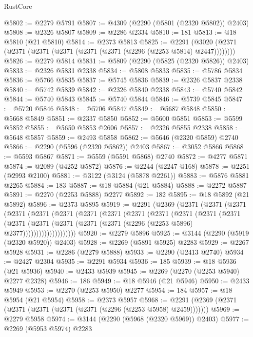 \begin{lexlean}{RustCore}
\begin{coremodule}
@5802 := @2279 @5791
@5807 := @4309 (@2290 (@5801 (@2320 @5802)) @2403)
@5808 := @2326 @5807
@5809 := @2286 @2334
@5810 := 181
@5813 := @18 @5810 (@21 @5810)
@5814 := @2373 @5813
@5825 := @2291 (@3020 (@2371 (@2371 (@2371 (@2371 (@2371 (@2371 (@2296 (@2253 @5814) @2447))))))))
@5826 := @2279 @5814
@5831 := @5809 (@2290 (@5825 (@2320 @5826)) @2403)
@5833 := @2326 @5831 @2338
@5834 := @5808 @5833
@5835 := @5786 @5834
@5836 := @5766 @5835
@5837 := @5745 @5836
@5839 := @2326 @5837 @2338
@5840 := @5742 @5839
@5842 := @2326 @5840 @2338
@5843 := @5740 @5842
@5844 := @5740 @5843
@5845 := @5740 @5844
@5846 := @5739 @5845
@5847 := @5720 @5846
@5848 := @5706 @5847
@5849 := @5687 @5848
@5850 := @5668 @5849
@5851 := @2337 @5850
@5852 := @5600 @5851
@5853 := @5599 @5852
@5855 := @5650 @5853 @2606
@5857 := @2326 @5855 @2338
@5858 := @5648 @5857
@5859 := @2493 @5858
@5862 := @5646 (@2320 @5859) @2740
@5866 := @2290 (@5596 (@2320 @5862)) @2403
@5867 := @3052 @5866
@5868 := @5593 @5867
@5871 := @5559 (@5591 @5868) @2740
@5872 := @4277 @5871
@5874 := @2089 (@4252 @5872)
@5876 := @2244 (@2247 @168)
@5878 := @2251 (@2993 @2100)
@5881 := @3122 (@3124 (@5878 @2261))
@5883 := @5876 @5881 @2265
@5884 := 183
@5887 := @18 @5884 (@21 @5884)
@5888 := @2272 @5887
@5891 := @2270 (@2253 @5888) @2277
@5892 := 182
@5895 := @18 @5892 (@21 @5892)
@5896 := @2373 @5895
@5919 := @2291
    (@2369
      (@2371
        (@2371
          (@2371
            (@2371
              (@2371
                (@2371
                  (@2371
                    (@2371
                      (@2371
                        (@2371
                          (@2371
                            (@2371
                              (@2371
                                (@2371
                                  (@2371
                                    (@2371
                                      (@2371 (@2371 (@2296 (@2253 @5896) @2377))))))))))))))))))))
@5920 := @2279 @5896
@5925 := @3144 (@2290 (@5919 (@2320 @5920)) @2403)
@5928 := @2269 (@5891 @5925) @2283
@5929 := @2267 @5928
@5931 := @2286 (@2279 @5888)
@5933 := @2290 (@2413 @2740)
@5934 := @2427 @2304
@5935 := @2291 @5934
@5936 := 185
@5939 := @18 @5936 (@21 @5936)
@5940 := @2433 @5939
@5945 := @2269 (@2270 (@2253 @5940) @2277 @2328)
@5946 := 186
@5949 := @18 @5946 (@21 @5946)
@5950 := @2433 @5949
@5953 := @2270 (@2253 @5950) @2277
@5954 := 184
@5957 := @18 @5954 (@21 @5954)
@5958 := @2373 @5957
@5968 := @2291 (@2369 (@2371 (@2371 (@2371 (@2371 (@2371 (@2296 (@2253 @5958) @2459)))))))
@5969 := @2279 @5958
@5974 := @3144 (@2290 (@5968 (@2320 @5969)) @2403)
@5977 := @2269 (@5953 @5974) @2283

\end{coremodule}
\end{lexlean}
